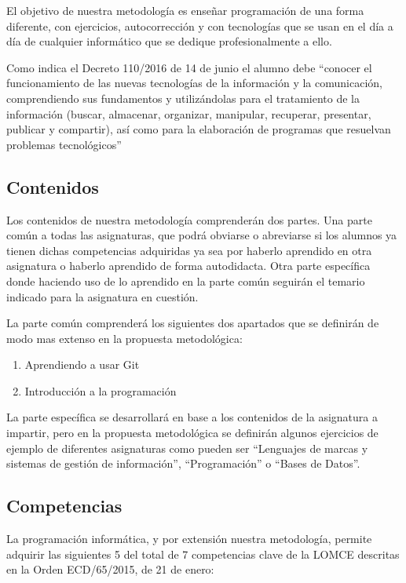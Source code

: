 El objetivo de nuestra metodología es enseñar programación de una forma diferente, con ejercicios, autocorrección y con tecnologías que se usan en el día a día de cualquier informático que se dedique profesionalmente a ello.

\bigskip
Como indica el Decreto 110/2016  de 14 de junio el alumno debe ``conocer el funcionamiento de las nuevas tecnologías de la información y la comunicación, comprendiendo sus fundamentos y utilizándolas para el tratamiento de la información (buscar, almacenar, organizar, manipular, recuperar, presentar, publicar y compartir), así como para la elaboración de programas que resuelvan problemas tecnológicos''


\subsection{Contenidos}

Los contenidos de nuestra metodología comprenderán dos partes. Una parte común a todas las asignaturas, que podrá obviarse o abreviarse si los alumnos ya tienen dichas competencias adquiridas ya sea por haberlo aprendido en otra asignatura o haberlo aprendido de forma autodidacta. Otra parte específica donde haciendo uso de lo aprendido en la parte común seguirán el temario indicado para la asignatura en cuestión.

\bigskip
La parte común comprenderá los siguientes dos apartados que se definirán de modo mas extenso en la propuesta metodológica:

\begin{enumerate}
    \item Aprendiendo a usar Git
    \item Introducción a la programación
\end{enumerate}

La parte específica se desarrollará en base a los contenidos de la asignatura a impartir, pero en la propuesta metodológica se definirán algunos ejercicios de ejemplo de diferentes asignaturas como pueden ser ``Lenguajes de marcas y sistemas de gestión de información'', ``Programación'' o ``Bases de Datos''.


\subsection{Competencias}

La programación informática, y por extensión nuestra metodología, permite adquirir las siguientes 5 del total de 7 competencias clave de la LOMCE descritas en la Orden ECD/65/2015, de 21 de enero:

